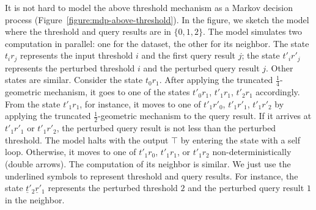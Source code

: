 It is not hard to model the above threshold mechanism as a Markov
decision process (Figure~\ref{figure:mdp-above-threshold}). In the
figure, we sketch the model where the threshold and query results are
in $\{ 0, 1, 2 \}$. The model simulates two computation in parallel:
one for the dataset, the other for its neighbor. The state $t_ir_j$
represents the input threshold $i$ and the first query result
$j$; the state $t'_ir'_j$ represents the perturbed threshold $i$ and
the perturbed query result $j$. Other states are similar. Consider the
state $t_0r_1$. After applying the truncated $\frac{1}{4}$-geometric
mechanism, it goes to one of the states $t'_0r_1$, $t'_1r_1$, $t'_2r_1$
accordingly. From the state $t'_1r_1$, for instance, it moves to one
of $t'_1r'_0$, $t'_1r'_1$, $t'_1r'_2$ by applying the truncated
$\frac{1}{2}$-geometric mechanism to the query result. If it arrives
at $t'_1r'_1$ or $t'_1r'_2$, the perturbed query result is not less
than the perturbed threshold. The model halts with the output $\top$
by entering the state with a self loop. 
Otherwise, it moves to one of $t'_1r_0$, $t'_1r_1$, or $t'_1r_2$
non-deterministically (double arrows). The computation of
its neighbor is similar. We just use the underlined symbols to
represent threshold and query results. For instance, the state
$\underline{t}'_2\underline{r}'_1$ represents the perturbed threshold
$2$ and the perturbed query result $1$ in the neighbor.

